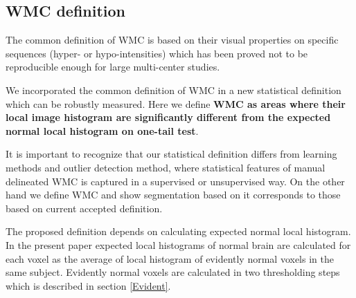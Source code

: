 \subsection{WMC definition}
The common definition of WMC is based on their visual properties on specific sequences (hyper- or hypo-intensities) which has been proved not to be reproducible enough for large multi-center studies. 
\par
We incorporated the common definition of WMC in a new statistical definition which can be robustly measured. Here we  define \textbf{WMC as areas where their local image histogram are significantly different from the expected normal local histogram on one-tail test}.
\par
It is important to recognize that our statistical definition differs from learning methods and outlier detection method, where statistical features of manual delineated WMC is captured in a supervised or unsupervised way.
On the other hand we define WMC and show segmentation based on it corresponds to those based on current accepted definition.
\par
The proposed definition depends on calculating expected normal local histogram. In the present paper expected local histograms of normal brain are calculated for each voxel as the average of local histogram of evidently normal voxels in the same subject. Evidently normal voxels are calculated in two thresholding steps which is described in section \ref{Evident}.
  
  
  